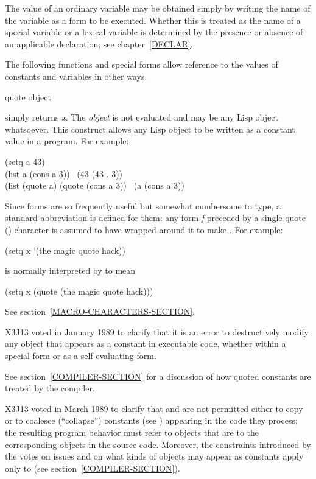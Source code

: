 The value of an ordinary variable
may be obtained simply by writing the name of the variable
as a form to be executed.  Whether this is treated as the name
of a special variable or a lexical variable is determined
by the presence or absence of an applicable  declaration;
see chapter~\ref{DECLAR}.

The following functions and special forms allow reference to the
values of constants and variables in other ways.

\begin{defspec}
quote object

 simply returns \textit{x}.
The \textit{object} is not evaluated and may be any Lisp object whatsoever.
This construct allows any Lisp object to be written as a constant
value in a program.
For example:
\begin{lisp}
(setq a 43) \\
(list a (cons a 3)) \EV\ (43 (43 . 3)) \\
(list (quote a) (quote (cons a 3)) \EV\ (a (cons a 3))
\end{lisp}
Since  forms are so frequently useful
but somewhat cumbersome to type, a standard abbreviation is defined for them:
any form \textit{f} preceded by a single quote () character
is assumed to have  wrapped around it to
make .
For example:
\begin{lisp}
(setq x '(the magic quote hack))
\end{lisp}
is normally interpreted by  to mean
\begin{lisp}
(setq x (quote (the magic quote hack)))
\end{lisp}
See section~\ref{MACRO-CHARACTERS-SECTION}.

\begin{newer}
X3J13 voted in January 1989  to clarify that
it is an error to destructively modify any object that appears as a constant
in executable code, whether within a  special form or as
a self-evaluating form.

See section~\ref{COMPILER-SECTION} for a discussion of how quoted constants
are treated by the compiler.
\end{newer}

\begin{newer}
X3J13 voted in March 1989  to clarify that
 and  are not permitted either to copy or
to coalesce (``collapse'') constants (see )
appearing in the code they process; the resulting
program behavior must refer to objects that are  to the
corresponding objects in the source code.
Moreover, the constraints introduced by the votes on
issues 
and 
on what kinds of objects may appear
as constants apply only to  (see section~\ref{COMPILER-SECTION}).
\end{newer}
\end{defspec}

